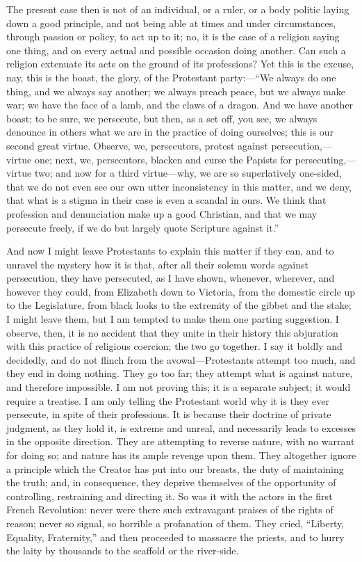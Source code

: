 The present case then is not of an individual, or a
ruler, or a body politic laying down a good principle,
and not being able at times and under circumstances,
through passion or policy, to act up to it; no, it is the
case of a religion saying one thing, and on every actual
and possible occasion doing another. Can such a religion
extenuate its acts on the ground of its professions? Yet
this is the excuse, nay, this is the boast, the glory, of
the Protestant party:—``We always do one thing, and
we always say another; we always preach peace, but we
always make war; we have the face of a lamb, and the
claws of a dragon. And we have another boast; to be sure,
we persecute, but then, as a set off, you see, we always
denounce in others what we are in the practice of doing
ourselves; this is our second great virtue. Observe, we,
persecutors, protest against persecution,—virtue
one; next, we, persecutors, blacken and curse the Papists
for persecuting,—virtue two; and now for a third
virtue—why, we are so superlatively one-sided, that
we do not even see our own utter inconsistency in this
matter, and we deny, that what is a stigma in their case
is even a scandal in ours. We think that profession and
denunciation make up a good Christian, and that we may
persecute freely, if we do but largely quote Scripture
against it.''

And now I might leave Protestants to explain this
matter if they can, and to unravel the mystery how it is
that, after all their solemn words against persecution,
they have persecuted, as I have shown, whenever,
wherever, and however they could, from Elizabeth down to
Victoria, from the domestic circle up to the Legislature,
from black looks to the extremity of the gibbet and the
stake; I might leave them, but I am tempted to make them
one parting suggestion. I observe, then, it is no
accident that they unite in their history this abjuration
with this practice of religious coercion; the two go
together. I say it boldly and decidedly, and do not
flinch from the avowal—Protestants attempt too much,
and they end in doing nothing. They go too far; they
attempt what is against nature, and therefore impossible.
I am not proving this; it is a separate subject; it would
require a treatise. I am only telling the Protestant
world why it is they ever persecute, in spite of their
professions. It is because their doctrine of private
judgment, as they hold it, is extreme and unreal, and
necessarily leads to excesses in the opposite direction.
They are attempting to reverse nature, with no warrant
for doing so; and nature has its ample revenge upon them.
They altogether ignore a principle which the Creator has
put into our breasts, the duty of maintaining the truth;
and, in consequence, they deprive themselves of the
opportunity of controlling, restraining and directing it.
So was it with the actors in the first French Revolution:
never were there such extravagant praises of the rights
of reason; never so signal, so horrible a profanation of
them. They cried, ``Liberty, Equality,
Fraternity,'' and then proceeded to massacre the
priests, and to hurry the laity by thousands to the
scaffold or the river-side.

